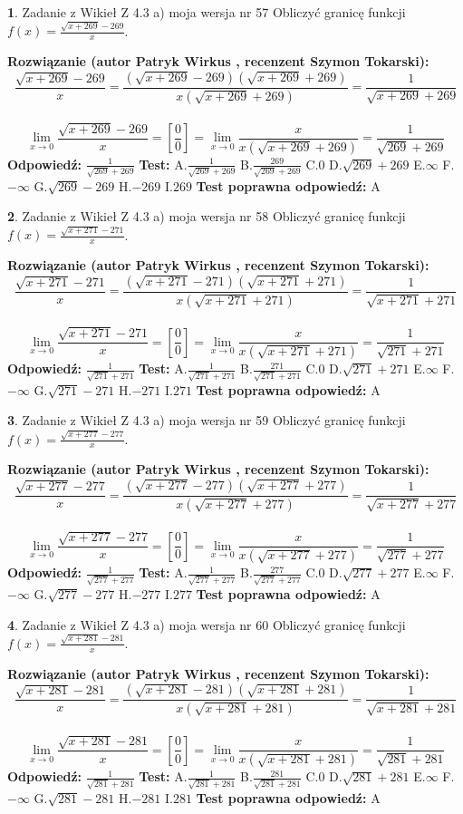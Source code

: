 \documentclass[12pt, a4paper]{article}
\theoremstyle{definition} %
\newtheorem{zad}{}
\newcommand{\zadStart}[1]{\begin{zad}#1\newline}
\newcommand{\zadStop}{\end{zad}}
\newcommand{\rozwStart}[2]{\noindent \textbf{Rozwiązanie (autor #1 , recenzent #2): }\newline}
\newcommand{\rozwStop}{\newline}
\newcommand{\odpStart}{\noindent \textbf{Odpowiedź:}\newline}
\newcommand{\odpStop}{\newline}
\newcommand{\testStart}{\noindent \textbf{Test:}\newline}
\newcommand{\testStop}{\newline}
\newcommand{\kluczStart}{\noindent \textbf{Test poprawna odpowiedź:}\newline}
\newcommand{\kluczStop}{\newline}
\begin{document}
\zadStart{Zadanie z Wikieł Z 4.3 a) moja wersja nr 57}
Obliczyć granicę funkcji $f(x)=\frac{\sqrt{x+269}-269}{x}$.
\zadStop
\rozwStart{Patryk Wirkus}{Szymon Tokarski}
$$\frac{\sqrt{x+269}-269}{x}=\frac{(\sqrt{x+269}-269)(\sqrt{x+269}+269)}{x(\sqrt{x+269}+269)}=\frac{1}{\sqrt{x+269}+269}$$
\\
$$\lim\limits_{x\to0}\frac{\sqrt{x+269}-269}{x}=[\frac{0}{0}]=
\lim\limits_{x\to0}\frac{x}{x(\sqrt{x+269}+269)} = \frac{1}{\sqrt{269}+269}$$
\rozwStop
\odpStart
$\frac{1}{\sqrt{269}+269}$
\odpStop
\testStart
A.$\frac{1}{\sqrt{269}+269}$
B.$\frac{269}{\sqrt{269}+269}$
C.$0$
D.$\sqrt{269}+269$
E.$\infty$
F.$-\infty$
G.$\sqrt{269}-269$
H.$-269$
I.$269$
\testStop
\kluczStart
A
\kluczStop



\zadStart{Zadanie z Wikieł Z 4.3 a) moja wersja nr 58}
Obliczyć granicę funkcji $f(x)=\frac{\sqrt{x+271}-271}{x}$.
\zadStop
\rozwStart{Patryk Wirkus}{Szymon Tokarski}
$$\frac{\sqrt{x+271}-271}{x}=\frac{(\sqrt{x+271}-271)(\sqrt{x+271}+271)}{x(\sqrt{x+271}+271)}=\frac{1}{\sqrt{x+271}+271}$$
\\
$$\lim\limits_{x\to0}\frac{\sqrt{x+271}-271}{x}=[\frac{0}{0}]=
\lim\limits_{x\to0}\frac{x}{x(\sqrt{x+271}+271)} = \frac{1}{\sqrt{271}+271}$$
\rozwStop
\odpStart
$\frac{1}{\sqrt{271}+271}$
\odpStop
\testStart
A.$\frac{1}{\sqrt{271}+271}$
B.$\frac{271}{\sqrt{271}+271}$
C.$0$
D.$\sqrt{271}+271$
E.$\infty$
F.$-\infty$
G.$\sqrt{271}-271$
H.$-271$
I.$271$
\testStop
\kluczStart
A
\kluczStop



\zadStart{Zadanie z Wikieł Z 4.3 a) moja wersja nr 59}
Obliczyć granicę funkcji $f(x)=\frac{\sqrt{x+277}-277}{x}$.
\zadStop
\rozwStart{Patryk Wirkus}{Szymon Tokarski}
$$\frac{\sqrt{x+277}-277}{x}=\frac{(\sqrt{x+277}-277)(\sqrt{x+277}+277)}{x(\sqrt{x+277}+277)}=\frac{1}{\sqrt{x+277}+277}$$
\\
$$\lim\limits_{x\to0}\frac{\sqrt{x+277}-277}{x}=[\frac{0}{0}]=
\lim\limits_{x\to0}\frac{x}{x(\sqrt{x+277}+277)} = \frac{1}{\sqrt{277}+277}$$
\rozwStop
\odpStart
$\frac{1}{\sqrt{277}+277}$
\odpStop
\testStart
A.$\frac{1}{\sqrt{277}+277}$
B.$\frac{277}{\sqrt{277}+277}$
C.$0$
D.$\sqrt{277}+277$
E.$\infty$
F.$-\infty$
G.$\sqrt{277}-277$
H.$-277$
I.$277$
\testStop
\kluczStart
A
\kluczStop



\zadStart{Zadanie z Wikieł Z 4.3 a) moja wersja nr 60}
Obliczyć granicę funkcji $f(x)=\frac{\sqrt{x+281}-281}{x}$.
\zadStop
\rozwStart{Patryk Wirkus}{Szymon Tokarski}
$$\frac{\sqrt{x+281}-281}{x}=\frac{(\sqrt{x+281}-281)(\sqrt{x+281}+281)}{x(\sqrt{x+281}+281)}=\frac{1}{\sqrt{x+281}+281}$$
\\
$$\lim\limits_{x\to0}\frac{\sqrt{x+281}-281}{x}=[\frac{0}{0}]=
\lim\limits_{x\to0}\frac{x}{x(\sqrt{x+281}+281)} = \frac{1}{\sqrt{281}+281}$$
\rozwStop
\odpStart
$\frac{1}{\sqrt{281}+281}$
\odpStop
\testStart
A.$\frac{1}{\sqrt{281}+281}$
B.$\frac{281}{\sqrt{281}+281}$
C.$0$
D.$\sqrt{281}+281$
E.$\infty$
F.$-\infty$
G.$\sqrt{281}-281$
H.$-281$
I.$281$
\testStop
\kluczStart
A
\kluczStop
\end{document}
